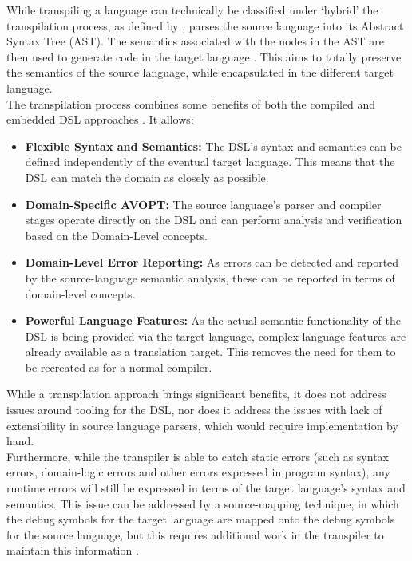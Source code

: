 \documentclass[a4paper,11pt]{report}
\begin{document}
While transpiling a language can technically be classified under `hybrid' the transpilation process, as defined by \citet{Mernik:2005:DDL:1118890.1118892}, parses the source language into its Abstract Syntax Tree (AST).
The semantics associated with the nodes in the AST are then used to generate code in the target language \citep[pg. 4]{Bouraqadi:2016:MPT:2991041.2991051}.
This aims to totally preserve the semantics of the source language, while encapsulated in the different target language. \\

The transpilation process combines some benefits of both the compiled and embedded DSL approaches \citep{kulkarnitranspiler}.
It allows:
\begin{itemize}
    \item \textbf{Flexible Syntax and Semantics:} The DSL's syntax and semantics can be defined independently of the eventual target language. 
    This means that the DSL can match the domain as closely as possible. 
    \item \textbf{Domain-Specific AVOPT:} The source language's parser and compiler stages operate directly on the DSL and can perform analysis and verification based on the Domain-Level concepts. 
    \item \textbf{Domain-Level Error Reporting:} As errors can be detected and reported by the source-language semantic analysis, these can be reported in terms of domain-level concepts. 
    \item \textbf{Powerful Language Features:} As the actual semantic functionality of the DSL is being provided via the target language, complex language features are already available as a translation target.
    This removes the need for them to be recreated as for a normal compiler. 
\end{itemize}

While a transpilation approach brings significant benefits, it does not address issues around tooling for the DSL, nor does it address the issues with lack of extensibility in source language parsers, which would require implementation by hand. \\

Furthermore, while the transpiler is able to catch static errors (such as syntax errors, domain-logic errors and other errors expressed in program syntax), any runtime errors will still be expressed in terms of the target language's syntax and semantics. 
This issue can be addressed by a source-mapping technique, in which the debug symbols for the target language are mapped onto the debug symbols for the source language, but this requires additional work in the transpiler to maintain this information \citep{kulkarnitranspiler}.
\end{document}

